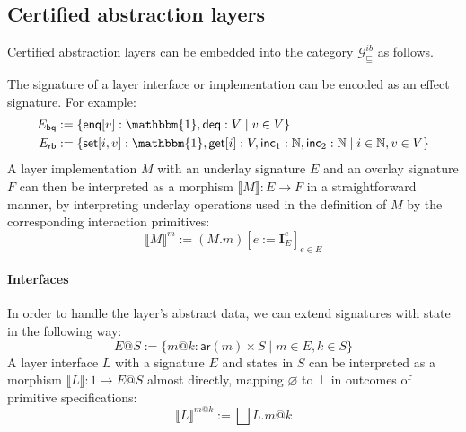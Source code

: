 \documentclass[sigplan,screen]{acmart}
\newcommand{\gcat}{\mathcal{G}_{\sqsubseteq}}
\newcommand{\kw}[1]{\ensuremath{ \mathsf{#1} }}
\begin{document}

\subsection{Certified abstraction layers} \label{sec:intspec:cal} %

Certified abstraction layers can be embedded into
the category $\gcat^{ib}$ as follows.


The signature of a layer interface or implementation
can be encoded as an effect signature.
For example:
\begin{align*}
  E_\kw{bq} &:= \{
    \kw{enq}[v] : \mathbbm{1}, \kw{deq} : V \mid
    v \in V \} \\
  E_\kw{rb} &:= \{
    \kw{set}[i, v] : \mathbbm{1},
    \kw{get}[i] : V,
    \kw{inc}_1 : \mathbb{N},
    \kw{inc}_2 : \mathbb{N} \mid
    i \in \mathbb{N}, v \in V \}
\end{align*}
A layer implementation $M$ with
an underlay signature $E$ and
an overlay signature $F$
can then be interpreted as a morphism
$\llbracket M \rrbracket : E \rightarrow F$
in a straightforward manner,
by interpreting underlay operations
used in the definition of $M$
by the corresponding interaction primitives:
\[
  \llbracket M \rrbracket^m := (M.m)[e := \mathbf{I}_E^e]_{e \in E}
\]

\paragraph{Interfaces}
In order to handle the layer's abstract data,
we can extend signatures with state in the following way:
\[
  E@S :=
    \{ m@k : \kw{ar}(m) \times S \mid
       m \in E, k \in S \}
\]
A layer interface $L$ with a signature $E$
and states in $S$
can be interpreted as
a morphism $\llbracket L \rrbracket : 1 \rightarrow E@S$
almost directly,
mapping $\varnothing$ to $\bot$
in outcomes of primitive specifications:
\[
  \llbracket L \rrbracket^{m@k} :=
    \bigsqcup L.m@k
\]
\end{document}
